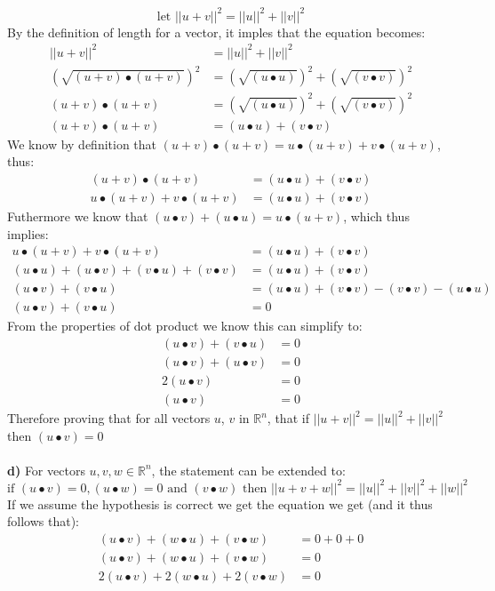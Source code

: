 \documentclass[11pt]{article}
\begin{document}
\[ \text{let } ||u+v||^2 = ||u||^2 + ||v||^2 \]
By the definition of length for a vector, it imples that the equation becomes: 
\begin{align*}
||u + v||^2 &=||u||^2 + ||v||^2 \\
(\sqrt{(u + v) \bullet (u + v)})^2 &= (\sqrt{(u \bullet u)})^2 + (\sqrt{(v \bullet v)})^2 \\
(u + v) \bullet (u + v) &= (\sqrt{(u \bullet u)})^2 + (\sqrt{(v \bullet v)})^2 \\
(u + v) \bullet (u + v) &= (u \bullet u) + (v \bullet v) 
\end{align*}
We know by definition that $(u + v) \bullet (u + v)  = u \bullet (u + v) +  v \bullet (u + v)$, thus:
\begin{align*}
(u + v) \bullet (u + v) &= (u \bullet u) + (v \bullet v) \\
u \bullet (u + v) +  v \bullet (u + v)   &= (u \bullet u) + (v \bullet v)  
\end{align*}
Futhermore we know that $(u \bullet v) + (u \bullet u) = u \bullet (u+ v)$, which thus implies:
\begin{align*}
u \bullet (u + v) +  v \bullet (u + v)   &= (u \bullet u) + (v \bullet v) \\
(u \bullet u) + (u \bullet v)  + (v \bullet u) + (v \bullet v)   &= (u \bullet u) + (v \bullet v) \\
(u \bullet v)  + (v \bullet u) &= (u \bullet u) + (v \bullet v) -   (v \bullet v)  - (u \bullet u)\\
(u \bullet v)  + (v \bullet u) &= 0
\end{align*}
From the properties of dot product we know this can simplify to:
\begin{align*}
(u \bullet v)  + (v \bullet u) &= 0\\
(u \bullet v)  + (u \bullet v) &= 0\\
2(u \bullet v) &= 0\\
(u \bullet v) &= 0
\end{align*}
Therefore proving that for all vectors $u$, $v$ in  $\mathbb{R}^n$, that if $||u + v||^2 =||u||^2 + ||v||^2$ then $(u \bullet v) = 0$\\\\
\textbf{d)} For vectors $u,v,w \in \mathbb{R}^n$, the statement can be extended to:
\[ \text{if } (u \bullet v) = 0, (u \bullet w) = 0 \text{ and } (v \bullet w) \text{ then } || u + v + w ||^2 = ||u||^2 + ||v||^2 + ||w||^2\]
If we assume the hypothesis is correct we get the equation we get (and it thus follows that):
\begin{align*}
(u \bullet v)  + (w \bullet u) + (v \bullet w) &= 0 + 0 + 0\\
(u \bullet v)  + (w \bullet u) + (v \bullet w)  &= 0 \\
2(u \bullet v)  + 2(w \bullet u) + 2(v \bullet w)  &= 0
\end{align*}
\end{document}
